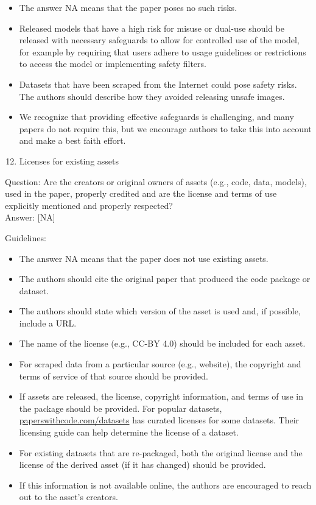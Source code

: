 \documentclass[10pt]{article}
\begin{document}
\begin{itemize}
  \item The answer NA means that the paper poses no such risks.
  \item Released models that have a high risk for misuse or dual-use should be released with necessary safeguards to allow for controlled use of the model, for example by requiring that users adhere to usage guidelines or restrictions to access the model or implementing safety filters.
  \item Datasets that have been scraped from the Internet could pose safety risks. The authors should describe how they avoided releasing unsafe images.
  \item We recognize that providing effective safeguards is challenging, and many papers do not require this, but we encourage authors to take this into account and make a best faith effort.
\end{itemize}

\begin{enumerate}
  \setcounter{enumi}{11}
  \item Licenses for existing assets
\end{enumerate}

Question: Are the creators or original owners of assets (e.g., code, data, models), used in the paper, properly credited and are the license and terms of use explicitly mentioned and properly respected?\\[0pt]
Answer: [NA]

Guidelines:

\begin{itemize}
  \item The answer NA means that the paper does not use existing assets.
  \item The authors should cite the original paper that produced the code package or dataset.
  \item The authors should state which version of the asset is used and, if possible, include a URL.
  \item The name of the license (e.g., CC-BY 4.0) should be included for each asset.
  \item For scraped data from a particular source (e.g., website), the copyright and terms of service of that source should be provided.
  \item If assets are released, the license, copyright information, and terms of use in the package should be provided. For popular datasets, \href{http://paperswithcode.com/datasets}{paperswithcode.com/datasets} has curated licenses for some datasets. Their licensing guide can help determine the license of a dataset.
  \item For existing datasets that are re-packaged, both the original license and the license of the derived asset (if it has changed) should be provided.
  \item If this information is not available online, the authors are encouraged to reach out to the asset's creators.
\end{itemize}
\end{document}

